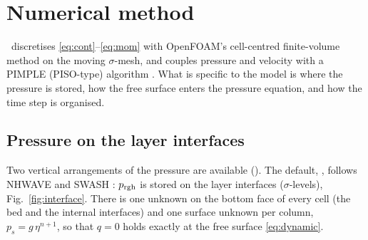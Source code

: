 \section{Numerical method}
\label{sec:numerics}

\NHFOAM\ discretises \eqref{eq:cont}--\eqref{eq:mom} with OpenFOAM's
cell-centred finite-volume method on the moving $\sigma$-mesh, and couples
pressure and velocity with a PIMPLE (PISO-type) algorithm \citep{issa1986}.
What is specific to the model is where the pressure is stored, how the free
surface enters the pressure equation, and how the time step is organised.

\subsection{Pressure on the layer interfaces}
\label{sec:interface}

Two vertical arrangements of the pressure are available
(). The default, , follows NHWAVE and
SWASH \citep{stelling2003,zijlema2005,ma2012}: $p_{\mathrm{rgh}}$ is stored on the layer
interfaces ($\sigma$-levels), Fig.~\ref{fig:interface}. There is one unknown on
the bottom face of every cell (the bed and the internal interfaces) and one
surface unknown per column, $p_s = g\,\eta^{n+1}$, so that $q=0$ holds exactly
at the free surface \eqref{eq:dynamic}.


